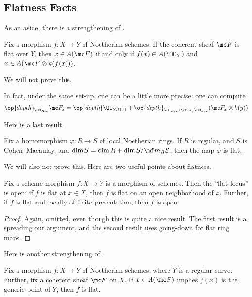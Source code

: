 \documentclass[../notes.tex]{subfiles}
\begin{document}
\subsection{Flatness Facts}
As an aside, there is a strengthening of .
\begin{proposition}
	Fix a morphism $f\colon X\to Y$ of Noetherian schemes. If the coherent sheaf $\mc F$ is flat over $Y$, then $x\in A(\mc F)$ if and only if $f(x)\in A(\OO_Y)$ and $x\in A(\mc F\otimes k(f(x)))$.
\end{proposition}
We will not prove this.
\begin{remark}
	In fact, under the same set-up, one can be a little more precise: one can compute
	\[\op{depth}_{\OO_{X,x}}\mc F_x=\op{depth}\OO_{Y,f(x)}+\op{depth}_{\OO_{X,x}/\mf m_y\OO_{X,x}}(\mc F_x\otimes k(y))\]
\end{remark}
Here is a last result.
\begin{theorem}
	Fix a homomorphism $\varphi\colon R\to S$ of local Noetherian rings. If $R$ is regular, and $S$ is Cohen--Macaulay, and $\dim S=\dim R+\dim S/\mf m_RS$, then the map $\varphi$ is flat.
\end{theorem}
We will also not prove this. Here are two useful points about flatness.
\begin{proposition}
	Fix a scheme morphism $f\colon X\to Y$ is a morphism of schemes. Then the ``flat locus'' is open: if $f$ is flat at $x\in X$, then $f$ is flat on an open neighborhood of $x$. Further, if $f$ is flat and locally of finite presentation, then $f$ is open.
\end{proposition}
\begin{proof}
	Again, omitted, even though this is quite a nice result. The first result is a spreading our argument, and the second result uses going-down for flat ring maps.
\end{proof}
Here is another strengthening of .
\begin{proposition}
	Fix a morphism $f\colon X\to Y$ of Noetherian schemes, where $Y$ is a regular curve. Further, fix a coherent sheaf $\mc F$ on $X$. If $x\in A(\mc F)$ implies $f(x)$ is the generic point of $Y$, then $f$ is flat.
\end{proposition}
\end{document}
